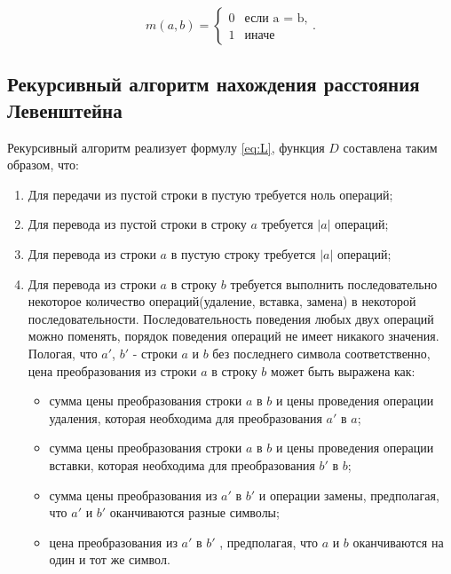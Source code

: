 \documentclass[a4paper,14pt, unknownkeysallowed]{bmstu}
\begin{document}
    \begin{equation}
        \label{eq:m}
        m(a, b) = \begin{cases}
        0 &\text{если a = b,}\\
        1 &\text{иначе}
        \end{cases}.
    \end{equation}

    \subsection{Рекурсивный алгоритм нахождения расстояния Левенштейна}

    Рекурсивный алгоритм реализует формулу \ref{eq:L}, функция $D$ составлена таким образом, что:
    \begin{enumerate}
        \item  Для передачи из пустой строки в пустую требуется ноль операций;
        \item Для перевода из пустой строки в строку $a$ требуется $|a|$ операций;
        \item Для перевода из строки $a$ в пустую строку требуется $|a|$ операций;
        \item Для перевода из строки $a$ в строку $b$ требуется выполнить последовательно некоторое количество операций(удаление, вставка, замена) в некоторой последовательности. Последовательность поведения любых двух операций можно поменять, порядок поведения операций не имеет никакого значения. Пологая, что $a'$, $b'$ - строки $a$ и $b$ без последнего символа соответственно, цена преобразования из строки $a$ в строку $b$ может быть выражена как:
        \begin{itemize}
    	\item сумма цены преобразования строки $a$ в $b$ и цены проведения операции удаления, которая необходима для преобразования $a'$ в $a$;
    	\item сумма цены преобразования строки $a$ в $b$ и цены проведения операции вставки, которая необходима для преобразования $b'$ в $b$;
    	\item сумма цены преобразования из $a'$ в $b'$ и операции замены, предполагая, что $a'$ и $b'$ оканчиваются разные символы;
    	\item цена преобразования из $a'$ в $b'$ , предполагая, что $a$ и $b$ оканчиваются на один и тот же символ.
	\end{itemize}
    \end{enumerate}
\end{document}

